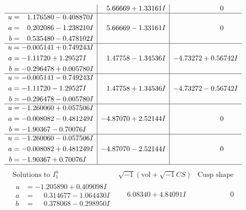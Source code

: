 \documentclass[1p]{elsarticle_modified}
\theoremstyle{definition}
\newcommand{\I}{\sqrt{-1}}
\begin{document}
$$\begin{array}{c|c|c}
 & \phantom{-}5.66669 + 1.33161 I & \phantom{-0.000000 } 0 \\ \hline\begin{aligned}
u &= \phantom{-}1.176580 - 0.408870 I \\
a &= \phantom{-}0.202086 - 1.238210 I \\
b &= \phantom{-}0.535480 - 0.478102 I\end{aligned}
 & \phantom{-}5.66669 - 1.33161 I & \phantom{-0.000000 } 0 \\ \hline\begin{aligned}
u &= -0.005141 + 0.749243 I \\
a &= -1.11720 + 1.29527 I \\
b &= -0.296478 + 0.005780 I\end{aligned}
 & \phantom{-}1.47758 - 1.34536 I & -4.73272 + 0.56742 I \\ \hline\begin{aligned}
u &= -0.005141 - 0.749243 I \\
a &= -1.11720 - 1.29527 I \\
b &= -0.296478 - 0.005780 I\end{aligned}
 & \phantom{-}1.47758 + 1.34536 I & -4.73272 - 0.56742 I \\ \hline\begin{aligned}
u &= -1.260060 + 0.057506 I \\
a &= -0.008082 - 0.481249 I \\
b &= -1.90367 - 0.70076 I\end{aligned}
 & -4.87070 + 2.52144 I & \phantom{-0.000000 } 0 \\ \hline\begin{aligned}
u &= -1.260060 - 0.057506 I \\
a &= -0.008082 + 0.481249 I \\
b &= -1.90367 + 0.70076 I\end{aligned}
 & -4.87070 - 2.52144 I & \phantom{-0.000000 } 0\\
 \hline 
 \end{array}$$\newpage$$\begin{array}{c|c|c}  
\text{Solutions to }I^u_{1}& \I (\text{vol} + \sqrt{-1}CS) & \text{Cusp shape}\\
 \hline 
\begin{aligned}
u &= -1.205890 + 0.409098 I \\
a &= \phantom{-}0.314677 - 1.064430 I \\
b &= \phantom{-}0.378068 - 0.298950 I\end{aligned}
 & \phantom{-}6.08340 + 4.84091 I & \phantom{-0.000000 } 0 \\ \hline\begin{aligned}

\end{aligned}
\end{array}$$
\end{document}
